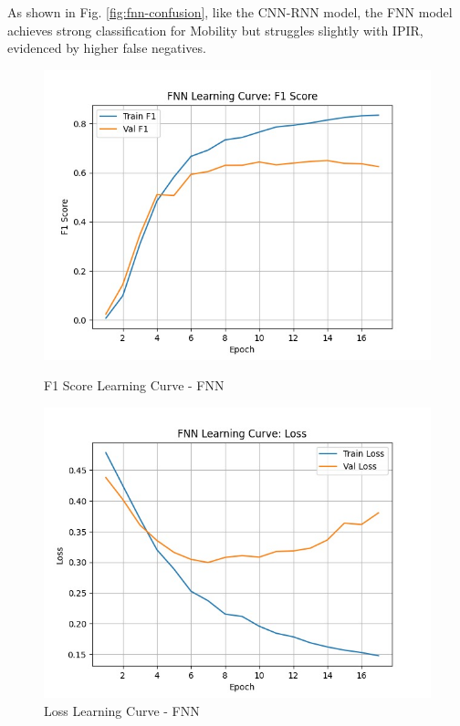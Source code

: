 As shown in Fig. \ref{fig:fnn-confusion}, like the CNN-RNN model, the FNN model achieves strong classification for Mobility but struggles slightly with IPIR, evidenced by higher false negatives.

\begin{figure}[H]
\centering
\begin{minipage}[b]{0.48\textwidth}
    \centering
    \includegraphics[width=\textwidth]{images/Supervised_Results/FNN_learningcurve_F1score.jpg}
    \caption{F1 Score Learning Curve - FNN}
    \label{fig:fnn-f1}
\end{minipage}
\hfill
\begin{minipage}[b]{0.48\textwidth}
    \centering
    \includegraphics[width=\textwidth]{images/Supervised_Results/FNN_learning_curve_loss.jpg}
    \caption{Loss Learning Curve - FNN}
    \label{fig:fnn-loss}
\end{minipage}
\end{figure}

